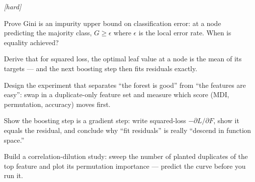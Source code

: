 \emph{[hard]}
\begin{exercise}
Prove Gini is an impurity upper bound on classification error: at a
node predicting the majority class, $G \ge \epsilon$ where
$\epsilon$ is the local error rate. When is equality achieved?
\end{exercise}
\begin{exercise}
Derive that for squared loss, the optimal leaf value at a node is the
mean of its targets --- and the next boosting step then fits residuals
exactly.
\end{exercise}
\begin{exercise}
Design the experiment that separates ``the forest is good'' from ``the
features are easy'': swap in a duplicate-only feature set and measure
which score (MDI, permutation, accuracy) moves first.
\end{exercise}
\begin{exercise}
Show the boosting step is a gradient step: write squared-loss
$-\partial L/\partial F$, show it equals the residual, and conclude why
``fit residuals'' is really ``descend in function space.''
\end{exercise}
\begin{exercise}
Build a correlation-dilution study: sweep the number of planted
duplicates of the top feature and plot its permutation importance ---
predict the curve before you run it.
\end{exercise}

